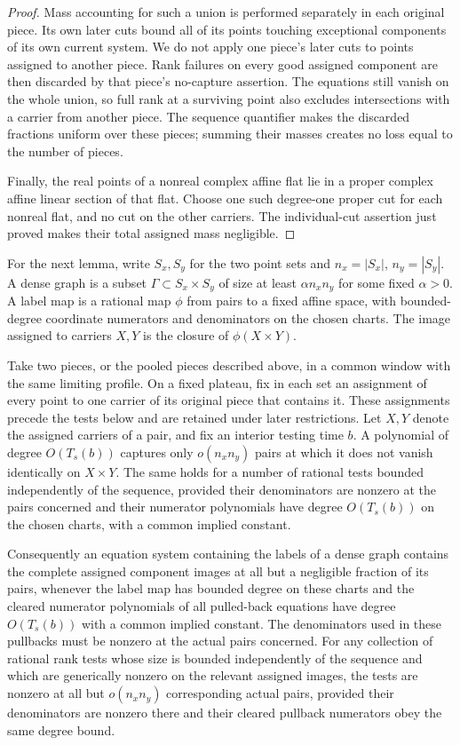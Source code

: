 \begin{proof}
Mass accounting for such a union is performed separately in each original piece.  Its own later cuts bound all of its points touching exceptional components of its own current system.  We do not apply one piece's later cuts to points assigned to another piece.  Rank failures on every good assigned component are then discarded by that piece's no-capture assertion.  The equations still vanish on the whole union, so full rank at a surviving point also excludes intersections with a carrier from another piece. The sequence quantifier makes the discarded fractions uniform over these pieces; summing their masses creates no loss equal to the number of pieces.

Finally, the real points of a nonreal complex affine flat lie in a proper complex affine linear section of that flat.  Choose one such degree-one proper cut for each nonreal flat, and no cut on the other carriers.  The individual-cut assertion just proved makes their total assigned mass negligible.
\end{proof}

For the next lemma, write $S_x,S_y$ for the two point sets and $n_x=|S_x|$, $n_y=|S_y|$.  A dense graph is a subset $\Gamma\subset S_x\times S_y$ of size at least $\alpha n_xn_y$ for some fixed $\alpha>0$.  A label map is a rational map $\phi$ from pairs to a fixed affine space, with bounded-degree coordinate numerators and denominators on the chosen charts.  The image assigned to carriers $X,Y$ is the closure of $\phi(X\times Y)$.

\begin{lemma}\label{lem:prof-product-testing}
Take two pieces, or the pooled pieces described above, in a common window with the same limiting profile. On a fixed plateau, fix in each set an assignment of every point to one carrier of its original piece that contains it. These assignments precede the tests below and are retained under later restrictions. Let $X,Y$ denote the assigned carriers of a pair, and fix an interior testing time $b$. A polynomial of degree $O(T_s(b))$ captures only $o(n_xn_y)$ pairs at which it does not vanish identically on $X\times Y$. The same holds for a number of rational tests bounded independently of the sequence, provided their denominators are nonzero at the pairs concerned and their numerator polynomials have degree $O(T_s(b))$ on the chosen charts, with a common implied constant.

Consequently an equation system containing the labels of a dense graph contains the complete assigned component images at all but a negligible fraction of its pairs, whenever the label map has bounded degree on these charts and the cleared numerator polynomials of all pulled-back equations have degree $O(T_s(b))$ with a common implied constant. The denominators used in these pullbacks must be nonzero at the actual pairs concerned. For any collection of rational rank tests whose size is bounded independently of the sequence and which are generically nonzero on the relevant assigned images, the tests are nonzero at all but $o(n_xn_y)$ corresponding actual pairs, provided their denominators are nonzero there and their cleared pullback numerators obey the same degree bound.
\end{lemma}

